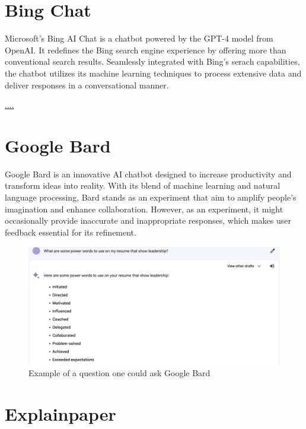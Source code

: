 \documentclass[
]{book}
\begin{document}
\hypertarget{bing-chat}{%
\section{Bing Chat}\label{bing-chat}}

Microsoft's Bing AI Chat is a chatbot powered by the GPT-4 model from OpenAI. It redefines the Bing search engine experience by offering more than conventional search results. Seamlessly integrated with Bing's serach capabilities, the chatbot utilizes its machine learning techniques to process extensive data and deliver responses in a conversational manner.

\url{....}

\hypertarget{google-bard}{%
\section{Google Bard}\label{google-bard}}

Google Bard is an innovative AI chatbot designed to increase productivity and transform ideas into reality. With its blend of machine learning and natural language processing, Bard stands as an experiment that aim to amplify people's imagination and enhance collaboration. However, as an experiment, it might occasionally provide inaccurate and inappropriate responses, which makes user feedback essential for its refinement.

\begin{figure}

{\centering \includegraphics[width=0.9\linewidth]{Google_Bard_Example} 

}

\caption{Example of a question one could ask Google Bard}\label{fig:unnamed-chunk-8}
\end{figure}

\hypertarget{explainpaper}{%
\section{Explainpaper}\label{explainpaper}}
\end{document}
